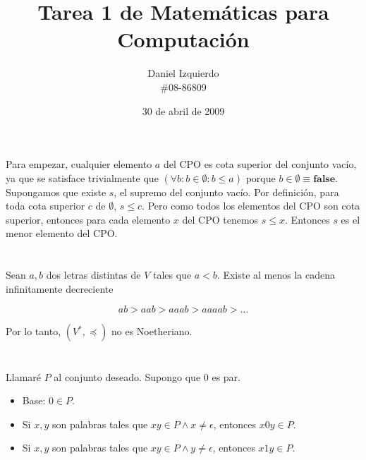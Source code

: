\documentclass{article}
\begin{document}

\title{Tarea 1 de Matemáticas para Computación}
\author{Daniel Izquierdo \\ \#08-86809}
\date{30 de abril de 2009}

\maketitle

\section{}

Para empezar, cualquier elemento $a$ del CPO es cota superior del conjunto
vacío, ya que se satisface trivialmente que
$(\forall b : b \in \emptyset : b \leq a)$
porque $b \in \emptyset \equiv \mathbf{false}$.
Supongamos que existe $s$, el supremo del conjunto vacío. Por definición,
para toda cota superior $c$ de $\emptyset$, $s \leq c$. Pero como todos los
elementos del CPO son cota superior, entonces para cada elemento $x$ del CPO
tenemos
$s \leq x$. Entonces $s$ es el menor elemento del CPO.

\section{}

Sean $a, b$ dos letras distintas de $V$ tales que $a < b$. Existe al menos la
cadena infinitamente decreciente

$$
ab > aab > aaab > aaaab > \ldots
$$

Por lo tanto, $(V^*,\preceq)$ no es Noetheriano.

\section{}

\section{}

\subsection{}

Llamaré $P$ al conjunto deseado. Supongo que $0$ es par.

\begin{itemize}
\item Base: $0 \in P$.

\item Si $x,y$ son palabras tales que
$xy \in P \wedge x \neq \epsilon$, entonces $x0y \in P$.

\item Si $x,y$ son palabras tales que
$xy \in P \wedge y \neq \epsilon$, entonces $x1y \in P$.
\end{itemize}
\end{document}
